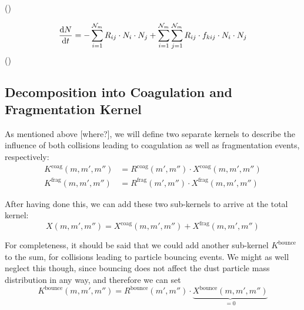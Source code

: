         ()

        \begin{equation}
            \frac{\text{d} N}{\text{d} t} =
            -\sum_{i=1}^{\mathcal N_m} 
                R_{ij} \cdot N_i \cdot N_j 
            +\sum_{i=1}^{\mathcal N_m} \sum_{j=1}^{\mathcal N_m} 
                R_{ij} \cdot f_{kij} \cdot N_i \cdot N_j
        \end{equation}
        ()

    \clearpage\subsection{Decomposition into Coagulation and Fragmentation Kernel}

        As mentioned above [where?], we will define two separate kernels to describe the influence 
        of both collisions leading to coagulation as well as fragmentation events, respectively:
        \begin{align}
            K^\text{coag}(m,m',m'') &= R^\text{coag}(m',m'') \cdot X^\text{coag}(m,m',m'') \\
            K^\text{frag}(m,m',m'') &= R^\text{frag}(m',m'') \cdot X^\text{frag}(m,m',m'')
        \end{align}

        After having done this, we can add these two sub-kernels to arrive at the total kernel:
        \begin{equation}
            X(m,m',m'') = X^\text{coag}(m,m',m'') + X^\text{frag}(m,m',m'')
        \end{equation}

        For completeness, it should be said that we could add another sub-kernel 
        $K^\text{bounce}$ to the sum, for collisions leading to particle bouncing events.
        We might as well neglect this though, since bouncing does not affect the dust particle mass 
        distribution in any way, and therefore we can set
        \begin{equation}
            K^\text{bounce}(m,m',m'') 
            = R^\text{bounce}(m',m'') \cdot \underbrace{X^\text{bounce}(m,m',m'')}_{=0}
        \end{equation}


